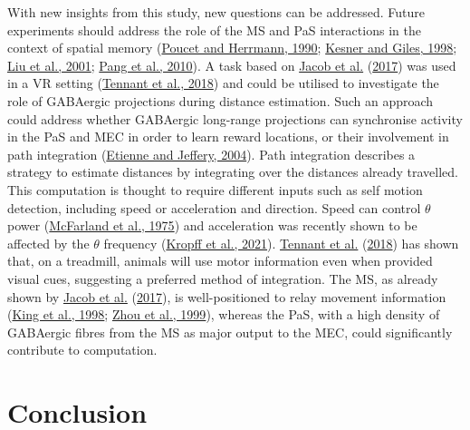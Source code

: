 \documentclass[
  12pt,
  a4paper,
  openany]{book}
\begin{document}
With new insights from this study, new questions can be addressed. Future experiments should address the role of the MS and PaS interactions in the context of spatial memory (\protect\hyperlink{ref-poucet_septum_1990}{Poucet and Herrmann, 1990}; \protect\hyperlink{ref-kesner_neural_1998}{Kesner and Giles, 1998}; \protect\hyperlink{ref-liu_excitotoxic_2001}{Liu et al., 2001}; \protect\hyperlink{ref-pang_damage_2010}{Pang et al., 2010}). A task based on \protect\hyperlink{ref-jacob_medial_2017}{Jacob et al.} (\protect\hyperlink{ref-jacob_medial_2017}{2017}) was used in a VR setting (\protect\hyperlink{ref-tennant_stellate_2018}{Tennant et al., 2018}) and could be utilised to investigate the role of GABAergic projections during distance estimation. Such an approach could address whether GABAergic long-range projections can synchronise activity in the PaS and MEC in order to learn reward locations, or their involvement in path integration (\protect\hyperlink{ref-etienne_path_2004}{Etienne and Jeffery, 2004}). Path integration describes a strategy to estimate distances by integrating over the distances already travelled. This computation is thought to require different inputs such as self motion detection, including speed or acceleration and direction. Speed can control \(\theta\) power (\protect\hyperlink{ref-mcfarland_relationship_1975}{McFarland et al., 1975}) and acceleration was recently shown to be affected by the \(\theta\) frequency (\protect\hyperlink{ref-kropff_frequency_2021}{Kropff et al., 2021}). \protect\hyperlink{ref-tennant_stellate_2018}{Tennant et al.} (\protect\hyperlink{ref-tennant_stellate_2018}{2018}) has shown that, on a treadmill, animals will use motor information even when provided visual cues, suggesting a preferred method of integration. The MS, as already shown by \protect\hyperlink{ref-jacob_medial_2017}{Jacob et al.} (\protect\hyperlink{ref-jacob_medial_2017}{2017}), is well-positioned to relay movement information (\protect\hyperlink{ref-king_rhythmicity_1998}{King et al., 1998}; \protect\hyperlink{ref-zhou_comparison_1999}{Zhou et al., 1999}), whereas the PaS, with a high density of GABAergic fibres from the MS as major output to the MEC, could significantly contribute to computation.

\hypertarget{conclusion}{%
\section{Conclusion}\label{conclusion}}
\end{document}

